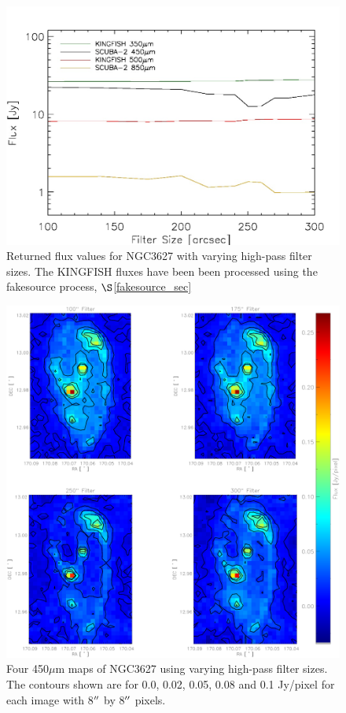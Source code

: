 \begin{figure}
  \centering
  \includegraphics[scale=0.65]{obs_imgs/flux_line.jpeg}
  \caption[Flux Values vs  High-Pass Filter Sizes]{Returned flux values for NGC3627 with varying high-pass filter sizes.  The KINGFISH fluxes have been been processed using the fakesource process, $\S$\ref{fakesource_sec}}
  \label{filt_lines}
\end{figure}

\begin{figure}
  \centering
  \includegraphics[scale=0.5]{obs_imgs/450_comparison_4.eps}
  \caption[450$\mu$m High-Pass Filter Images]{Four 450$\mu$m maps of NGC3627 using varying high-pass filter sizes.  The contours shown are for 0.0, 0.02, 0.05, 0.08 and 0.1 Jy/pixel for each image with 8$\mbox{$^{\prime\prime}$}$ by 8$\mbox{$^{\prime\prime}$}$ pixels.}
    \label{450_flt}
\end{figure}

